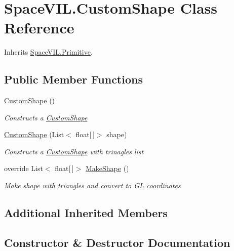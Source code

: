 \hypertarget{class_space_v_i_l_1_1_custom_shape}{}\section{Space\+V\+I\+L.\+Custom\+Shape Class Reference}
\label{class_space_v_i_l_1_1_custom_shape}


Inherits \mbox{\hyperlink{class_space_v_i_l_1_1_primitive}{Space\+V\+I\+L.\+Primitive}}.

\subsection*{Public Member Functions}
\begin{DoxyCompactItemize}
\item 
\mbox{\hyperlink{class_space_v_i_l_1_1_custom_shape_ab67f8e1e17f268ca2e24f516f762323e}{Custom\+Shape}} ()
\begin{DoxyCompactList}\small\item\em Constructs a \mbox{\hyperlink{class_space_v_i_l_1_1_custom_shape}{Custom\+Shape}} \end{DoxyCompactList}\item 
\mbox{\hyperlink{class_space_v_i_l_1_1_custom_shape_ad5b5ff7c5f594e7b7fcde384b8cb6d0b}{Custom\+Shape}} (List$<$ float\mbox{[}$\,$\mbox{]}$>$ shape)
\begin{DoxyCompactList}\small\item\em Constructs a \mbox{\hyperlink{class_space_v_i_l_1_1_custom_shape}{Custom\+Shape}} with trinagles list \end{DoxyCompactList}\item 
override List$<$ float\mbox{[}$\,$\mbox{]}$>$ \mbox{\hyperlink{class_space_v_i_l_1_1_custom_shape_aa8a1eb76ab361eea35540787f79fac6f}{Make\+Shape}} ()
\begin{DoxyCompactList}\small\item\em Make shape with triangles and convert to GL coordinates \end{DoxyCompactList}\end{DoxyCompactItemize}
\subsection*{Additional Inherited Members}


\subsection{Constructor \& Destructor Documentation}
\mbox{\label{class_space_v_i_l_1_1_custom_shape_ab67f8e1e17f268ca2e24f516f762323e}} 
